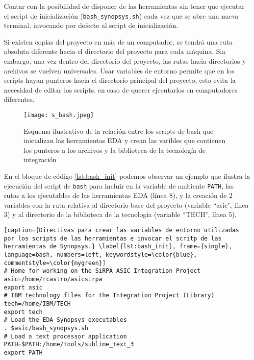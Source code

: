 Contar con la posibilidad de disponer de las herramientas sin tener que ejecutar el script de inicialización (\texttt{bash\_synopsys.sh}) cada vez que se abre una nueva terminal, invocando por defecto al script de inicialización.

Si existen copias del proyecto en más de un computador, se tendrá una ruta absoluta diferente hacia el directorio del proyecto para cada máquina. Sin embargo, una vez dentro del directorio del proyecto, las rutas hacia directorios y archivos se vuelven universales. Usar variables de entorno permite que en los scripts hayan punteros hacia el directorio principal del proyecto, esto evita la necesidad de editar los scripts, en caso de querer ejecutarlos en computadores diferentes.


\begin{figure}[h]
\texttt{[image: s\_bash.jpeg]}
\centering
\caption{Esquema ilustrativo de la relación entre los scripts de bash que inicializan las herramientas EDA y crean las varibles que contienen los punteros a los archivos y la biblioteca de la tecnología de integración}
\label{bash_syn}
\end{figure}

En el bloque de código \ref{lst:bash_init} podemos observar un ejemplo que ilustra la ejecución del script de \texttt{bash} para incluir en la variable de ambiente \texttt{PATH}, las rutas a los ejecutables de las herramientas EDA (línea 8), y la creación de 2 variables con la ruta relativa al directorio base del proyecto (variable ``asic", línea 3) y al directorio de la biblioteca de la tecnología (variable ``TECH", línea 5).\\

\newpage
{}

\begin{lstlisting}[caption={Directivas para crear las variables de entorno utilizadas por los scripts de las herramientas e invocar el scritp de las herramientas de Synopsys.} \label{lst:bash_init}, frame={single}, language=bash, numbers=left, keywordstyle=\color{blue}, commentstyle=\color{mygreen}]
# Home for working on the SiRPA ASIC Integration Project
asic=/home/rcastro/asicsirpa
export asic
# IBM technology files for the Integration Project (Library)
tech=/home/IBM/TECH
export tech
# Load the EDA Synopsys executables
. $asic/bash_synopsys.sh
# Load a text processor application
PATH=$PATH:/home/tools/sublime_text_3
export PATH
\end{lstlisting}


